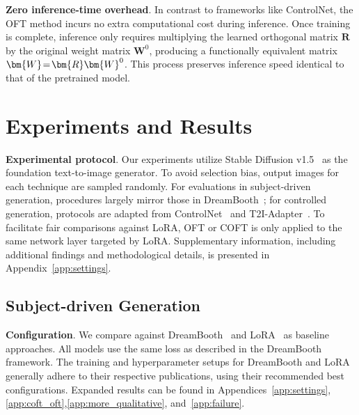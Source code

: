 \textbf{Zero inference-time overhead}. In contrast to frameworks like ControlNet, the OFT method incurs no extra computational cost during inference. Once training is complete, inference only requires multiplying the learned orthogonal matrix $\bm{R}$ by the original weight matrix $\bm{W}^0$, producing a functionally equivalent matrix $\thickmuskip=2mu \medmuskip=2mu \bm{W}=\bm{R}\bm{W}^0$. This process preserves inference speed identical to that of the pretrained model.

\section{Experiments and Results}

\textbf{Experimental protocol}. Our experiments utilize Stable Diffusion v1.5~\cite{rombach2022high} as the foundation text-to-image generator. To avoid selection bias, output images for each technique are sampled randomly. For evaluations in subject-driven generation, procedures largely mirror those in DreamBooth~\cite{ruiz2023dreambooth}; for controlled generation, protocols are adapted from ControlNet~\cite{zhang2023adding} and T2I-Adapter~\cite{mou2023t2i}. To facilitate fair comparisons against LoRA, OFT or COFT is only applied to the same network layer targeted by LoRA. Supplementary information, including additional findings and methodological details, is presented in Appendix~\ref{app:settings}.

\subsection{Subject-driven Generation}

\textbf{Configuration}. We compare against DreamBooth~\cite{ruiz2023dreambooth} and LoRA~\cite{hulora2022} as baseline approaches. All models use the same loss as described in the DreamBooth framework. The training and hyperparameter setups for DreamBooth and LoRA generally adhere to their respective publications, using their recommended best configurations. Expanded results can be found in Appendices~\ref{app:settings},\ref{app:coft_oft},\ref{app:more_qualitative}, and~\ref{app:failure}.

